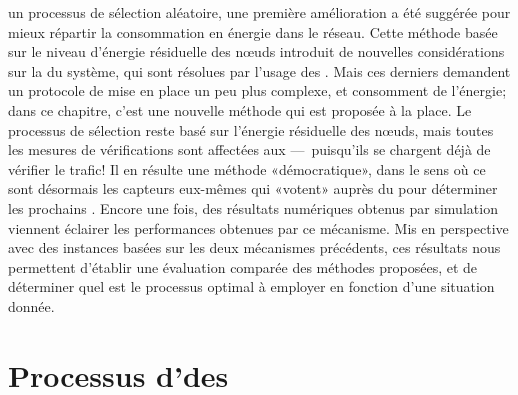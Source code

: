 \vfill
{} un processus de sélection aléatoire, une première amélioration a été suggérée pour mieux répartir la consommation en énergie dans le réseau.
Cette méthode basée sur le niveau d'énergie résiduelle des nœuds introduit de nouvelles considérations sur la \secu du système, qui sont résolues par l'usage des \vns.
Mais ces derniers demandent un protocole de mise en place un peu plus complexe, et consomment de l'énergie; dans ce chapitre, c'est une nouvelle méthode qui est proposée à la place.
\vfill
Le processus de sélection reste basé sur l'énergie résiduelle des nœuds, mais toutes les mesures de vérifications sont affectées aux \cns ---~puisqu'ils se chargent déjà de vérifier le trafic!
Il en résulte une méthode «démocratique», dans le sens où ce sont désormais les capteurs eux-mêmes qui «votent» auprès du \ch pour déterminer les prochains \cns.
Encore une fois, des résultats numériques obtenus par simulation viennent éclairer les performances obtenues par ce mécanisme.
Mis en perspective avec des instances basées sur les deux mécanismes précédents, ces résultats nous permettent d'établir une évaluation comparée des méthodes proposées, et de déterminer quel est le processus optimal à employer en fonction d'une situation donnée.
\vfill

\pagebreak %
\section{Processus d'\elecdem des \cns}\label{sd:sec:proposal}

